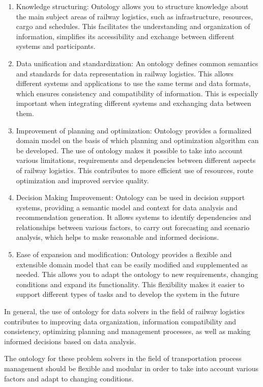 \documentclass[a4paper]{article}
\begin{document}
\begin{multicols}{2}
\begin{enumerate}[label=\arabic*)]
\itemsep=-1.5mm
\item Knowledge structuring: Ontology allows you to
structure knowledge about the main subject areas of railway logistics, such as infrastructure,
resources, cargo and schedules. This facilitates
the understanding and organization of information,
simplifies its accessibility and exchange between
different systems and participants.
\item Data unification and standardization: An ontology
defines common semantics and standards for data
representation in railway logistics. This allows different systems and applications to use the same terms and data formats, which ensures consistency
and compatibility of information. This is especially
important when integrating different systems and
exchanging data between them.
\item Improvement of planning and optimization: Ontology provides a formalized domain model on the basis of which planning and optimization algorithm can be developed. The use of ontology makes it possible to take into account various limitations,
requirements and dependencies between different
aspects of railway logistics. This contributes to
more efficient use of resources, route optimization
and improved service quality.
\item Decision Making Improvement: Ontology can be
used in decision support systems, providing a semantic model and context for data analysis and
recommendation generation. It allows systems to
identify dependencies and relationships between
various factors, to carry out forecasting and scenario analysis, which helps to make reasonable and
informed decisions.
\item  Ease of expansion and modification: Ontology
provides a flexible and extensible domain model
that can be easily modified and supplemented as
needed. This allows you to adapt the ontology to
new requirements, changing conditions and expand
its functionality. This flexibility makes it easier to
support different types of tasks and to develop the
system in the future
\end{enumerate}

\par In general, the use of ontology for data solvers in the
field of railway logistics contributes to improving data
organization, information compatibility and consistency,
optimizing planning and management processes, as well
as making informed decisions based on data analysis.
\par The ontology for these problem solvers in the field
of transportation process management should be flexible
and modular in order to take into account various factors
and adapt to changing conditions.


\end{multicols}
\end{document}
